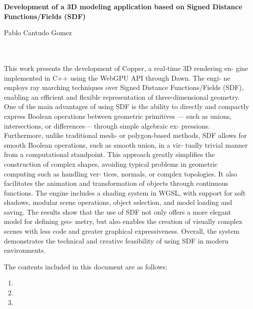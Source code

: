 \thispagestyle{empty}


\begin{center}
{\large\bfseries Development of a 3D modeling application based on Signed
Distance Functions/Fields (SDF)}\\
\end{center}
\begin{center}
Pablo Cantudo Gomez \\
\end{center}

\\

\vspace{0.7cm}
\\

This work presents the development of Copper, a real-time 3D rendering en-
gine implemented in C++ using the WebGPU API through Dawn. The engi-
ne employs ray marching techniques over Signed Distance Functions/Fields
(SDF), enabling an efficient and flexible representation of three-dimensional
geometry. One of the main advantages of using SDF is the ability to directly
and compactly express Boolean operations between geometric primitives —
such as unions, intersections, or differences— through simple algebraic ex-
pressions. Furthermore, unlike traditional mesh- or polygon-based methods,
SDF allows for smooth Boolean operations, such as smooth union, in a vir-
tually trivial manner from a computational standpoint.
\bigbreak
This approach greatly simplifies the construction of complex shapes,
avoiding typical problems in geometric computing such as handling ver-
tices, normals, or complex topologies. It also facilitates the animation and
transformation of objects through continuous functions. The engine includes
a shading system in WGSL, with support for soft shadows, modular scene
operations, object selection, and model loading and saving. The results show
that the use of SDF not only offers a more elegant model for defining geo-
metry, but also enables the creation of visually complex scenes with less code
and greater graphical expressiveness. Overall, the system demonstrates the
technical and creative feasibility of using SDF in modern environments.

The contents included in this document are as follows:
\begin{enumerate}
    \item  
    \item  
    \item  
\end{enumerate}

